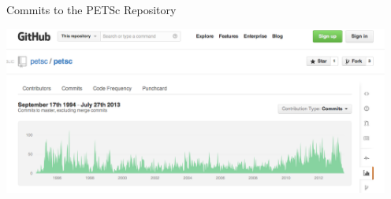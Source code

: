 \begin{frame}{Commits to the PETSc Repository}

\begin{center}
\includegraphics[width=5.0in]{figures/PETSc/Commits}
\end{center}

\end{frame}
